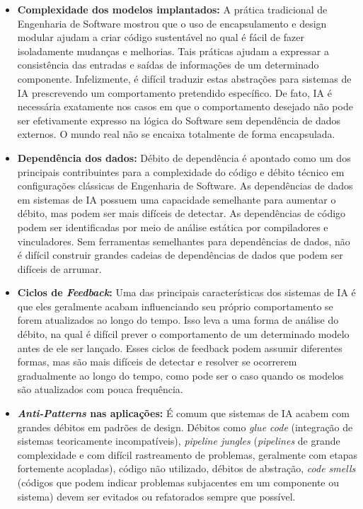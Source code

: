 \documentclass[portugues]{ic-tese}
\begin{document}
\begin{itemize}
    \item \textbf{Complexidade dos modelos implantados:} A prática tradicional de Engenharia de Software mostrou que o uso de encapsulamento e design modular ajudam a criar código sustentável no qual é fácil de fazer isoladamente mudanças e melhorias. Tais práticas ajudam a expressar a consistência das entradas e saídas de informações de um determinado componente. Infelizmente, é difícil traduzir estas abstrações para sistemas de IA prescrevendo um comportamento pretendido específico. De fato, IA é necessária exatamente nos casos em que o comportamento desejado não pode ser efetivamente expresso na lógica do Software sem dependência de dados externos. O mundo real não se encaixa totalmente de forma encapsulada.
    \item \textbf{Dependência dos dados:} Débito de dependência é apontado como um dos principais contribuintes para a complexidade do código e débito técnico em configurações clássicas de Engenharia de Software. As dependências de dados em sistemas de IA possuem uma capacidade semelhante para aumentar o débito, mas podem ser mais difíceis de detectar. As dependências de código podem ser identificadas por meio de análise estática por compiladores e vinculadores. Sem ferramentas semelhantes para dependências de dados, não é difícil construir grandes cadeias de dependências de dados que podem ser difíceis de arrumar.
    \item \textbf{Ciclos de \textit{Feedback}:} Uma das principais características dos sistemas de IA é que eles geralmente acabam influenciando seu próprio comportamento se forem atualizados ao longo do tempo. Isso leva a uma forma de análise do débito, na qual é difícil prever o comportamento de um determinado modelo antes de ele ser lançado. Esses ciclos de feedback podem assumir diferentes formas, mas são mais difíceis de detectar e resolver se ocorrerem gradualmente ao longo do tempo, como pode ser o caso quando os modelos são atualizados com pouca frequência.
    \item \textbf{\textit{Anti-Patterns} nas aplicações:} É comum que sistemas de IA acabem com grandes débitos em padrões de design. Débitos como \textit{glue code} (integração de sistemas teoricamente incompatíveis), \textit{pipeline jungles} (\textit{pipelines} de grande complexidade e com difícil rastreamento de problemas, geralmente com etapas fortemente acopladas), código não utilizado, débitos de abstração, \textit{code smells} (códigos que podem indicar problemas subjacentes em um componente ou sistema) devem ser evitados ou refatorados sempre que possível.

\end{itemize}
\end{document}
